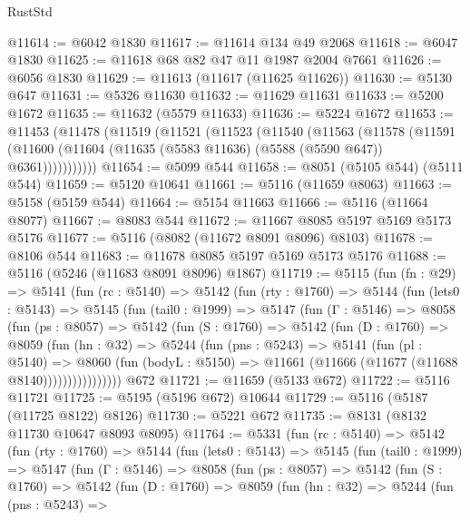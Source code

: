 \begin{lexlean}{RustStd}
\begin{coremodule}
@11614 := @6042 @1830
@11617 := @11614 @134 @49 @2068
@11618 := @6047 @1830
@11625 := @11618 @68 @82 @47 @11 @1987 @2004 @7661
@11626 := @6056 @1830
@11629 := @11613 (@11617 (@11625 @11626))
@11630 := @5130 @647
@11631 := @5326 @11630
@11632 := @11629 @11631
@11633 := @5200 @1672
@11635 := @11632 (@5579 @11633)
@11636 := @5224 @1672
@11653 := @11453
    (@11478
      (@11519
        (@11521
          (@11523
            (@11540
              (@11563
                (@11578
                  (@11591
                    (@11600 (@11604 (@11635 (@5583 @11636) (@5588 (@5590 @647)) @6361)))))))))))
@11654 := @5099 @544
@11658 := @8051 (@5105 @544) (@5111 @544)
@11659 := @5120 @10641
@11661 := @5116 (@11659 @8063)
@11663 := @5158 (@5159 @544)
@11664 := @5154 @11663
@11666 := @5116 (@11664 @8077)
@11667 := @8083 @544
@11672 := @11667 @8085 @5197 @5169 @5173 @5176
@11677 := @5116 (@8082 (@11672 @8091 @8096) @8103)
@11678 := @8106 @544
@11683 := @11678 @8085 @5197 @5169 @5173 @5176
@11688 := @5116 (@5246 (@11683 @8091 @8096) @1867)
@11719 := @5115
    (fun (fn : @29) =>
    @5141
      (fun (rc : @5140) =>
      @5142
        (fun (rty : @1760) =>
        @5144
          (fun (lets0 : @5143) =>
          @5145
            (fun (tail0 : @1999) =>
            @5147
              (fun (Γ : @5146) =>
              @8058
                (fun (ps : @8057) =>
                @5142
                  (fun (S : @1760) =>
                  @5142
                    (fun (D : @1760) =>
                    @8059
                      (fun (hn : @32) =>
                      @5244
                        (fun (pns : @5243) =>
                        @5141
                          (fun (pl : @5140) =>
                          @8060
                            (fun (bodyL : @5150) =>
                            @11661 (@11666 (@11677 (@11688 @8140))))))))))))))))
    @672
@11721 := @11659 (@5133 @672)
@11722 := @5116 @11721
@11725 := @5195 (@5196 @672) @10644
@11729 := @5116 (@5187 (@11725 @8122) @8126)
@11730 := @5221 @672
@11735 := @8131 (@8132 @11730 @10647 @8093 @8095)
@11764 := @5331
    (fun (rc : @5140) =>
    @5142
      (fun (rty : @1760) =>
      @5144
        (fun (lets0 : @5143) =>
        @5145
          (fun (tail0 : @1999) =>
          @5147
            (fun (Γ : @5146) =>
            @8058
              (fun (ps : @8057) =>
              @5142
                (fun (S : @1760) =>
                @5142
                  (fun (D : @1760) =>
                  @8059
                    (fun (hn : @32) =>
                    @5244
                      (fun (pns : @5243) =>

\end{coremodule}
\end{lexlean}
